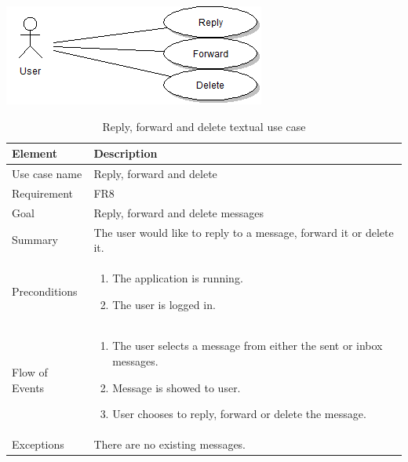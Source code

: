 \begin{table}
\begin{center}
\begin{center}
\includegraphics[width=\textwidth]{reply_forward_delete}
\end{center}
\begin{tabular}{p{3cm}|p{12cm}} \hline
\textbf{Element} & \textbf{Description} \\ \hline \hline
Use case name & Reply, forward and delete \\
Requirement & FR8	 \\
Goal & Reply, forward and delete messages\\
Summary & The user would like to reply to a message, forward it or delete it. \\
Preconditions &
\begin{enumerate}
\item{}The application is running.
\item{}The user is logged in.
\end{enumerate} \\ \hline
Flow of Events &
\begin{enumerate}
\item{}The user selects a message from either the sent or inbox messages.
\item{}Message is showed to user.
\item{}User chooses to reply, forward or delete the message. 
\end{enumerate} \\ \hline
Exceptions & There are no existing messages.\\ \hline
\end{tabular}
\end{center}
\caption{Reply, forward and delete textual use case} \label{tab:reply}
\end{table}

